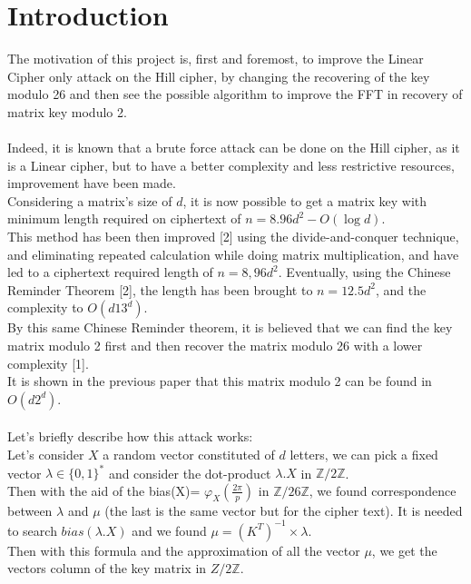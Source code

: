 \documentclass{article}
\begin{document}

\section{Introduction}
The motivation of this project is, first and foremost, to improve the Linear Cipher only attack on the Hill cipher, by changing the recovering of the key modulo 26 and then see the possible algorithm to improve the FFT in recovery of matrix key modulo 2.\\
\\
Indeed, it is known that a brute force attack can be done on the Hill cipher, as it is a Linear cipher, but to have a better complexity and less restrictive resources, improvement have been made.\\
Considering a matrix's size of $d$, it is now possible to get a matrix key with minimum length required on ciphertext of $n =8.96d^2 -O(\log d)$.\\
This method has been then improved [2] using the divide-and-conquer technique, and eliminating repeated calculation while doing matrix multiplication, and have led to a ciphertext required length of $n=8,96d^2$. Eventually, using the Chinese Reminder Theorem [2], the length has been brought to $n=12.5d^2$, and the complexity to $O(d13^d)$.\\
By this same Chinese Reminder theorem, it is believed that we can find the key matrix modulo 2 first and then recover the matrix modulo 26 with a lower complexity [1].\\
It is shown in the previous paper that this matrix modulo 2 can be found in $O(d2^d)$.\\
\\
Let's briefly describe how this attack works:\\
Let's consider $X$ a random vector constituted of $d$ letters, we can pick a fixed vector $\lambda \in \{0,1\}^*$ and consider the dot-product $\lambda . X$ in $\mathbb{Z}/2\mathbb{Z}$.\\
Then with the aid of the bias(X)= $\varphi_{X}(\frac{2\pi}{p})$ in $\mathbb{Z}/26\mathbb{Z}$, we found correspondence between $\lambda$ and $\mu$ (the last is the same vector but for the cipher text). It is needed to search $bias(\lambda . X)$ and we found $ \mu = (K^T)^{-1} \times\lambda $.\\
Then with this formula and the approximation of all the vector $\mu$, we get the vectors column of the key matrix in ${Z}/2\mathbb{Z}$.\\
\end{document}
